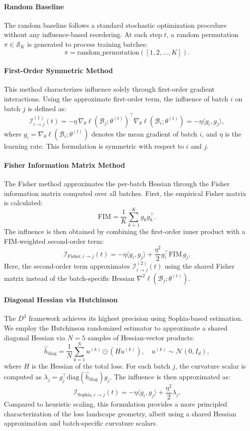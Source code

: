 \paragraph{Random Baseline}
The random baseline follows a standard stochastic optimization procedure without any influence-based reordering. At each step $t$, a random permutation $\pi \in \mathcal{S}_K$ is generated to process training batches:
\[
\pi = \text{random\_permutation}([1, 2, \dots, K]).
\]

\paragraph{First-Order Symmetric Method}
This method characterizes influence solely through first-order gradient interactions. Using the approximate first-order term, the influence of batch $i$ on batch $j$ is defined as:
\[
\mathcal{I}^{(1)}_{i \to j}(t) = -\eta \, \nabla_\theta \ell(\mathcal{B}_j; \theta^{(t)})^\top \nabla_\theta \ell(\mathcal{B}_i; \theta^{(t)}) = -\eta \langle g_i, g_j \rangle,
\]
where $g_i = \nabla_\theta \ell(\mathcal{B}_i; \theta^{(t)})$ denotes the mean gradient of batch $i$, and $\eta$ is the learning rate. This formulation is symmetric with respect to $i$ and $j$.

\paragraph{Fisher Information Matrix Method}
The Fisher method approximates the per-batch Hessian through the Fisher information matrix computed over all batches. First, the empirical Fisher matrix is calculated:
\[
\text{FIM} = \frac{1}{K} \sum_{k=1}^K g_k g_k^\top.
\]
The influence is then obtained by combining the first-order inner product with a FIM-weighted second-order term:
\[
\mathcal{I}_{\text{Fisher}, i \to j}(t) = -\eta \langle g_i, g_j \rangle + \frac{\eta^2}{2} g_i^\top \text{FIM} \, g_j.
\]
Here, the second-order term approximates $\mathcal{I}^{(2)}_{i \to j}(t)$ using the shared Fisher matrix instead of the batch-specific Hessian $\nabla^2 \ell(\mathcal{B}_j; \theta^{(t)})$.



\paragraph{Diagonal Hessian via Hutchinson}
The $D^3$ framework achieves its highest precision using Sophia-based estimation. We employ the Hutchinson randomized estimator to approximate a shared diagonal Hessian via $N=5$ samples of Hessian-vector products:
\[
\hat{h}_{\text{diag}} = \frac{1}{N} \sum_{k=1}^{N} u^{(k)} \odot (H u^{(k)}), \quad u^{(k)} \sim \mathcal{N}(0, I_d),
\]
where $H$ is the Hessian of the total loss. For each batch $j$, the curvature scalar is computed as $\lambda_j = g_j^\top \text{diag}(\hat{h}_{\text{diag}}) g_j$. The influence is then approximated as:
\[
\mathcal{I}_{\text{Sophia}, i \to j}(t) = -\eta \langle g_i, g_j \rangle + \frac{\eta^2}{2} \lambda_j.
\]
Compared to heuristic scaling, this formulation provides a more principled characterization of the loss landscape geometry, albeit using a shared Hessian approximation and batch-specific curvature scalars.
